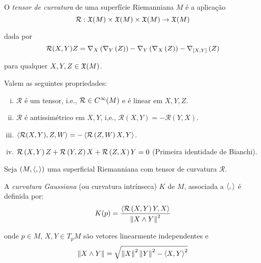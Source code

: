 \begin{defi}
	O \emph{tensor de curvatura} de uma superfície Riemanniana $M$ é a aplicação
	\begin{equation*}
		\mathcal{R}: \mathfrak{X}(M) \times \mathfrak{X}(M) \times \mathfrak{X}(M) \rightarrow \mathfrak{X}(M)
	\end{equation*}
	
	dada por
	\begin{equation*}
		\mathcal{R}(X,Y) Z = \nabla_{X} \left( \nabla_{Y} \left( Z \right) \right) - \nabla_{Y} \left( \nabla_{X} \left( Z \right) \right) - \nabla_{\left[ X, Y \right]} \left( Z \right)
	\end{equation*}
	
	para qualquer $X,Y,Z \in \mathfrak{X}(M)$.
\end{defi}

\begin{prop}
	Valem as seguintes propriedades:
	\begin{enumerate}[i)]
		\item $\mathcal{R}$ é um tensor, i.e., $\mathcal{R} \in C^{\infty}(M)$ e é linear em $X,Y,Z$.
		\item $\mathcal{R}$ é antissimétrico em $X,Y$, i,e., $\mathcal{R}(X,Y) = -\mathcal{R}(Y,X)$.
		\item $\left\langle \mathcal{R}(X,Y),Z,W \right\rangle = -\left\langle \mathcal{R} \left( Z,W \right) X,Y \right\rangle$.
		\item $\mathcal{R} \left( X,Y \right) Z + \mathcal{R} \left( Y,Z \right) X + \mathcal{R} \left( Z,X \right) Y = 0$ (Primeira identidade de Bianchi).
	\end{enumerate}
\end{prop}

\begin{defi}
	Seja $(M,\left\langle , \right\rangle)$ uma superficial Riemanniana com tensor de curvatura $\mathcal{R}$.
	
	A \emph{curvatura Gaussiana} (ou curvatura intrínseca) $K$ de $M$, associada a $\left\langle , \right\rangle$ é definida por:
	\begin{equation*}
		K(p) = \frac{\left\langle \mathcal{R} \left( X,Y \right) Y,X \right\rangle}{\left\| X \wedge Y \right\|^2}
	\end{equation*}
	
	onde $p \in M$, $X,Y \in T_pM$ são vetores linearmente independentes e
	\begin{equation*}
		\left\| X \wedge Y \right\|= \sqrt{\left\| X \right\|^2 \left\| Y \right\|^2 - \left\langle X,Y \right\rangle^2}
	\end{equation*}
\end{defi}

